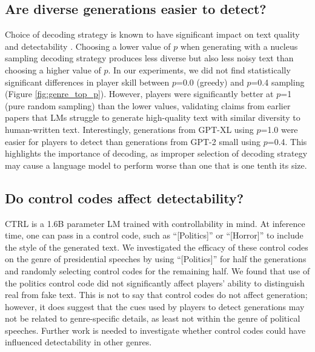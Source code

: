 

\subsection{Are diverse generations easier to detect?}
Choice of decoding strategy is known to have significant impact on text quality \citep{zhang2020trading} and detectability \citep{ippolito-etal-2020-automatic}.
Choosing a lower value of $p$ when generating with a nucleus sampling \citep{holtzmanetal2020} decoding strategy produces less diverse but also less noisy text than choosing a higher value of $p$.
In our experiments, we did not find statistically significant differences in player skill between $p$=0.0 (greedy) and $p$=0.4 sampling (Figure \ref{fig:genre_top_p}).
However, players were significantly better at $p$=1 (pure random sampling) than the lower values, 
validating claims from earlier papers that LMs struggle to generate high-quality text with similar diversity to human-written text.
Interestingly, generations from GPT-XL using $p$=1.0 were easier for players to detect than generations from GPT-2 small using $p$=0.4.
This highlights the importance of decoding, as improper selection of decoding strategy may cause a language model to perform worse than one that is one tenth its size.


\subsection{Do control codes affect detectability?}
CTRL is a 1.6B parameter LM trained with controllability in mind.
At inference time, one can pass in a control code, such as ``[Politics]'' or ``[Horror]'' to include the style of the generated text.
We investigated the efficacy of these control codes on the genre of presidential speeches by using ``[Politics]'' for half the generations and randomly selecting control codes for the remaining half.
We found that use of the politics control code did not significantly affect  players' ability to distinguish real from fake text.
This is not to say that control codes do not affect generation; however, it does suggest that the cues used by players to detect generations may not be related to genre-specific details, as least not within the genre of political speeches.
Further work is needed to investigate whether control codes could have influenced detectability in other genres.

